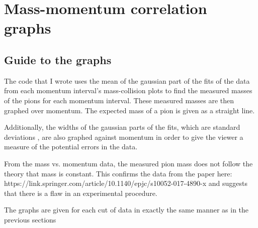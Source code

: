 \documentclass[11pt]{article}
\begin{document}
\section{Mass-momentum correlation graphs} 
\subsection{Guide to the graphs} %
The code that I wrote uses the mean of the gaussian part of the fits of the data from each momentum interval's mass-collision plots to find the measured masses of the pions for each momentum interval. These measured masses are then graphed over momentum. The expected mass of a pion is given as a straight line.

Additionally, the widths of the gaussian parts of the fits, which are standard deviations , are also graphed against momentum in order to give the viewer a measure of the potential errors in the data.

From the mass vs. momentum data, the measured pion mass does not follow the theory that mass is constant. This confirms the data from the paper here: https://link.springer.com/article/10.1140/epjc/s10052-017-4890-x and suggests that there is a flaw in an experimental procedure.

The graphs are given for each cut of data in exactly the same manner as in the previous sections 
\end{document}
